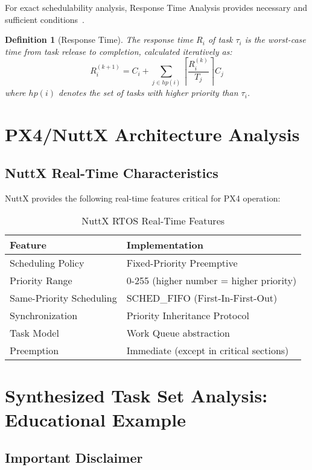 \documentclass[12pt,a4paper]{article}
\newtheorem{definition}{Definition}
\begin{document}
For exact schedulability analysis, Response Time Analysis provides necessary and sufficient conditions~\cite{audsley1993}.

\begin{definition}[Response Time]
The response time $R_i$ of task $\tau_i$ is the worst-case time from task release to completion, calculated iteratively as:
$$R_i^{(k+1)} = C_i + \sum_{j \in hp(i)} \left\lceil \frac{R_i^{(k)}}{T_j} \right\rceil C_j$$
where $hp(i)$ denotes the set of tasks with higher priority than $\tau_i$.
\end{definition}

\section{PX4/NuttX Architecture Analysis}

\subsection{NuttX Real-Time Characteristics}

NuttX provides the following real-time features critical for PX4 operation:

\begin{table}[H]
\centering
\caption{NuttX RTOS Real-Time Features}
\begin{tabular}{ll}
\toprule
\textbf{Feature} & \textbf{Implementation} \\
\midrule
Scheduling Policy & Fixed-Priority Preemptive \\
Priority Range & 0-255 (higher number = higher priority) \\
Same-Priority Scheduling & SCHED\_FIFO (First-In-First-Out) \\
Synchronization & Priority Inheritance Protocol \\
Task Model & Work Queue abstraction \\
Preemption & Immediate (except in critical sections) \\
\bottomrule
\end{tabular}
\end{table}

\section{Synthesized Task Set Analysis: Educational Example}

\subsection{Important Disclaimer}
\end{document}
